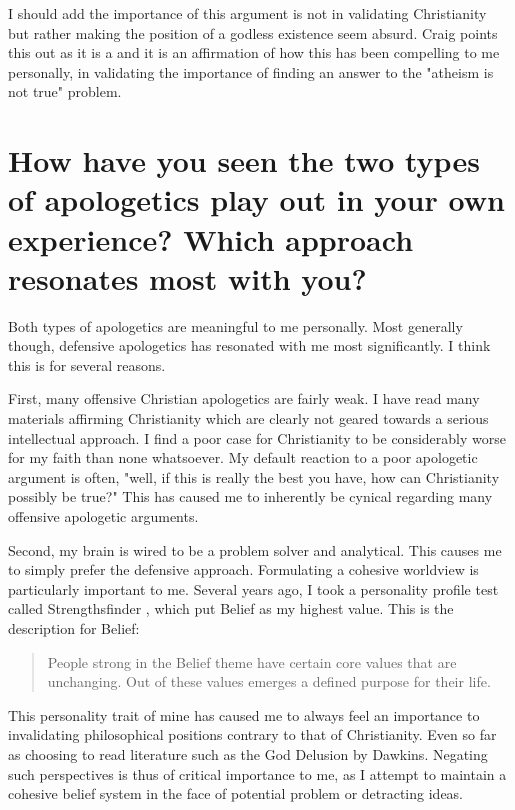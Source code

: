 \documentclass[12pt]{turabian-researchpaper}
\begin{document}
I should add the importance of this argument is not in validating Christianity but rather making the position of a godless existence seem absurd. Craig points this out as it is a and it is an affirmation of how this has been compelling to me personally, in validating the importance of finding an answer to the "atheism is not true" problem.



\section{How have you seen the two types of apologetics play out in your own experience? Which approach resonates most with you?}

Both types of apologetics are meaningful to me personally. Most generally though, defensive apologetics has resonated with me most significantly. I think this is for several reasons.

First, many offensive Christian apologetics are fairly weak. I have read many materials affirming Christianity which are clearly not geared towards a serious intellectual approach. I find a poor case for Christianity to be considerably worse for my faith than none whatsoever. My default reaction to a poor apologetic argument is often, "well, if this is really the best you have, how can Christianity possibly be true?" This has caused me to inherently be cynical regarding many offensive apologetic arguments.

Second, my brain is wired to be a problem solver and analytical. This causes me to simply prefer the defensive approach. Formulating a cohesive worldview is particularly important to me. Several years ago, I took a personality profile test called Strengthsfinder \autocite{rath2007strengthsfinder}, which put Belief as my highest value. This is the description for Belief:

\begin{quotation}
People strong in the Belief theme have certain core values that are unchanging. Out
of these values emerges a defined purpose for their life.
\end{quotation}

This personality trait of mine has caused me to always feel an importance to invalidating philosophical positions contrary to that of Christianity. Even so far as choosing to read literature such as the God Delusion by Dawkins. Negating such perspectives is thus of critical importance to me, as I attempt to maintain a cohesive belief system in the face of potential problem or detracting ideas.

\newpage
\printbibliography
\end{document}
